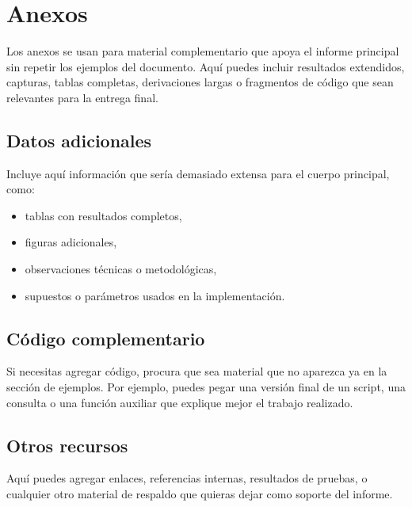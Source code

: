 \section{Anexos} \label{sec:anexos}

Los anexos se usan para material complementario que apoya el informe principal sin repetir los ejemplos del documento.
Aquí puedes incluir resultados extendidos, capturas, tablas completas, derivaciones largas o fragmentos de código que sean relevantes para la entrega final.

\subsection{Datos adicionales} \label{sec:anexo_datos_adicionales}
Incluye aquí información que sería demasiado extensa para el cuerpo principal, como:

\begin{itemize}
    \item tablas con resultados completos,
    \item figuras adicionales,
    \item observaciones técnicas o metodológicas,
    \item supuestos o parámetros usados en la implementación.
\end{itemize}

\subsection{Código complementario} \label{sec:anexo_codigo_complementario}
Si necesitas agregar código, procura que sea material que no aparezca ya en la sección de ejemplos.
Por ejemplo, puedes pegar una versión final de un script, una consulta o una función auxiliar que explique mejor el trabajo realizado.

\subsection{Otros recursos} \label{sec:otros_recursos}
Aquí puedes agregar enlaces, referencias internas, resultados de pruebas, o cualquier otro material de respaldo que quieras dejar como soporte del informe.